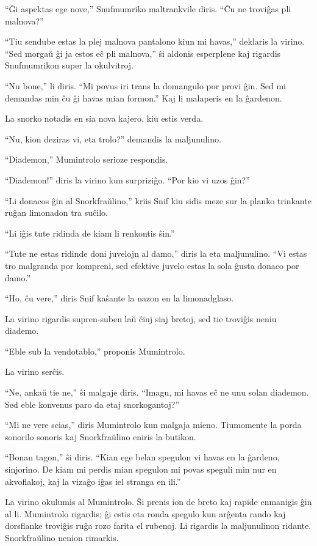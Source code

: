 ``Ĝi aspektas ege nove,'' Snufmumriko maltrankvile diris. ``Ĉu ne troviĝas pli malnova?''

``Tiu sendube estas la plej malnova pantalono kiun mi havas,'' deklaris la virino. ``Sed morgaŭ ĝi ja estos eĉ pli malnova,'' ŝi aldonis esperplene kaj rigardis Snufmumrikon super la okulvitroj.

``Nu bone,'' li diris. ``Mi povus iri trans la domangulo por provi ĝin. Sed mi demandas min ĉu ĝi havas mian formon.'' Kaj li malaperis en la ĝardenon.

\sectionbreak

La snorko notadis en sia nova kajero, kiu estis verda.

``Nu, kion deziras vi, eta trolo?'' demandis la maljunulino.

``Diademon,'' Mumintrolo serioze respondis.

``Diademon!'' diris la virino kun surpriziĝo. ``Por kio vi uzos ĝin?''

``Li donacos ĝin al Snorkfraŭlino,'' kriis Snif kiu sidis meze sur la planko trinkante ruĝan limonadon tra suĉilo.

``Li iĝis tute ridinda de kiam li renkontis ŝin.''

``Tute ne estas ridinde doni juvelojn al damo,'' diris la eta maljunulino. ``Vi estas tro malgranda por kompreni, sed efektive juvelo estas la sola ĝusta donaco por damo.''

``Ho, ĉu vere,'' diris Snif kaŝante la nazon en la limonadglaso.

La virino rigardis supren-suben laŭ ĉiuj siaj bretoj, sed tie troviĝis neniu diademo.

``Eble sub la vendotablo,'' proponis Mumintrolo.

La virino serĉis.

``Ne, ankaŭ tie ne,'' ŝi malgaje diris. ``Imagu, mi havas eĉ ne unu solan diademon. Sed eble konvenus paro da etaj snorkogantoj?''

``Mi ne vere scias,'' diris Mumintrolo kun malgaja mieno. Tiumomente la porda sonorilo sonoris kaj Snorkfraŭlino eniris la butikon.

``Bonan tagon,'' ŝi diris. ``Kian ege belan spegulon vi havas en la ĝardeno, sinjorino. De kiam mi perdis mian spegulon mi povas speguli min nur en akvoflakoj, kaj la vizaĝo iĝas iel stranga en ili.''

La virino okulumis al Mumintrolo. Ŝi prenis ion de breto kaj rapide enmanigis ĝin al li. Mumintrolo rigardis; ĝi estis eta ronda spegulo kun arĝenta rando kaj dorsflanke troviĝis ruĝa rozo farita el rubenoj. Li rigardis la maljunulinon ridante. Snorkfraŭlino nenion rimarkis.

